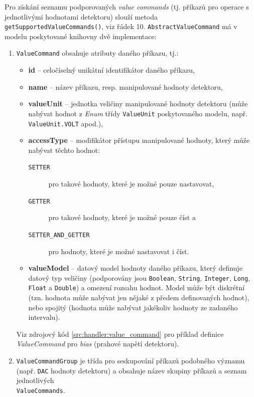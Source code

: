 Pro získání seznamu podporovaných \textit{value commands} (tj. příkazů pro operace s jednotlivými hodnotami detektoru) slouží metoda \texttt{getSupportedValueCommands()}, viz řádek 10. \texttt{AbstractValueCommand} má v modelu poskytované knihovny dvě implementace:
\begin{enumerate}[label=(\roman*)]
	\item \texttt{ValueCommand} obsahuje atributy daného příkazu, tj.:
	\begin{itemize}
		\item \textbf{id} -- celočíselný unikátní identifikátor daného příkazu,
		\item \textbf{name} -- název příkazu, resp. manipulované hodnoty detektoru,
		\item \textbf{valueUnit} -- jednotka veličiny manipulované hodnoty detektoru (může nabývat hodnot z \textit{Enum} třídy \texttt{ValueUnit} poskytovaného modelu, např. \texttt{ValueUnit.VOLT} apod.),
		\item \textbf{accessType} -- modifikátor přístupu manipulované hodnoty, který může nabývat těchto hodnot:
		\begin{description}
			\item[\texttt{SETTER}] pro takové hodnoty, které je možné pouze nastavovat,
			\item[\texttt{GETTER}] pro takové hodnoty, které je možné pouze číst a
			\item[\texttt{SETTER\_AND\_GETTER}] pro hodnoty, které je možné nastavovat i číst.
		\end{description}
		\item \textbf{valueModel} -- datový model hodnoty daného příkazu, který definuje datový typ veličiny (podporovány jsou \texttt{Boolean}, \texttt{String}, \texttt{Integer}, \texttt{Long}, \texttt{Float} a \texttt{Double}) a omezení rozsahu hodnot. Model může být diskrétní (tzn. hodnota může nabývat jen nějaké z předem definovaných hodnot), nebo spojitý (hodnota může nabývat jakékoliv hodnoty ze zadaného intervalu).
	\end{itemize}
	Viz zdrojový kód \ref{src:handler:value_command} pro příklad definice \textit{ValueCommand} pro \textit{bias} (prahové napětí detektoru).

	\item \texttt{ValueCommandGroup} je třída pro seskupování příkazů podobného významu (např. \texttt{DAC} hodnoty detektoru) a obsahuje název skupiny příkazů a seznam jednotlivých\\\texttt{ValueCommands}.
\end{enumerate}

